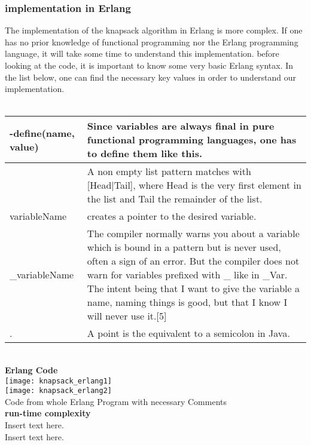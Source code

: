 \subsubsection{implementation in Erlang}
The implementation of the knapsack algorithm in Erlang is more complex. If one has no prior knowledge of functional programming nor the Erlang programming language, it will take some time to understand this implementation. before looking at the code, it is important to know some very basic Erlang syntax. In the list below, one can find the necessary key values in order to understand our implementation.\\\\
\begin{tabular}{|lp{5cm}|}
\hline
-define(name, value)  & Since variables are always final in pure functional programming languages, one has to define them like this.\\ \hline
[H|T] & A non empty list pattern matches with [Head|Tail], where Head is the very first element in the list and Tail the remainder of the list. \\  \hline
\?variableName & creates a pointer to the desired variable. \\ \hline
\_variableName & The compiler normally warns you about a variable which is bound in a pattern but is never used, often a sign of an error. But the compiler does not warn for variables prefixed with \_ like in \_Var. The intent being that I want to give the variable a name, naming things is good, but that I know I will never use it.[5] \\ \hline 
. & A point is the equivalent to a semicolon in Java.\\ \hline
\end{tabular}\\
\pagebreak
\textbf{Erlang Code}\\
\texttt{[image: knapsack\_erlang1]}\\
\texttt{[image: knapsack\_erlang2]}\\
Code from whole Erlang Program with necessary Comments\\
\textbf{run-time complexity}\\
Insert text here.\\
Insert text here.\\

